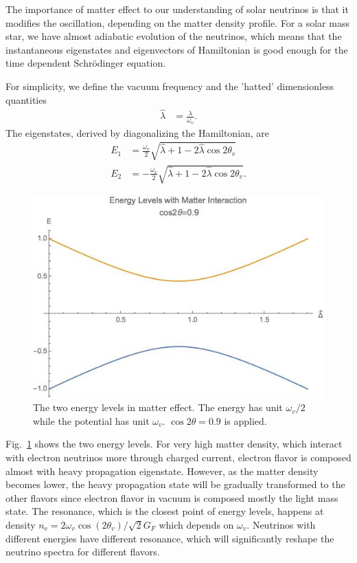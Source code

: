 The importance of matter effect to our understanding of solar neutrinos is that it modifies the oscillation, depending on the matter density profile. For a solar mass star, we have almost adiabatic evolution of the neutrinos, which means that the instantaneous eigenstates and eigenvectors of Hamiltonian is good enough for the time dependent Schr\"{o}dinger equation. 


For simplicity, we define the vacuum frequency and the 'hatted' dimensionless quantities
\begin{align}
\hat\lambda & = \frac{\lambda}{\omega_v}.
\end{align}
The eigenstates, derived by diagonalizing the Hamiltonian, are
\begin{align}
E_1 &= \frac{\omega_v}{2}\sqrt{ \hat\lambda +1 -  2\hat\lambda \cos 2\theta_v }\\
E_2 &= -\frac{\omega_v}{2}\sqrt{ \hat\lambda +1 -  2\hat\lambda \cos 2\theta_v }.
\end{align}


\begin{figure}
\centering
\includegraphics[width=0.7\columnwidth]{chapters/assets/solar/mswEnergyLevels.jpg}
\caption{The two energy levels in matter effect. The energy has unit $\omega_v/2$ while the potential has unit $\omega_v$. $\cos2\theta=0.9$ is applied.}
\label{fig:mswEnergyLevels}
\end{figure}

Fig.~\ref{fig:mswEnergyLevels} shows the two energy levels. For very high matter density, which interact with electron neutrinos more through charged current, electron flavor is composed almost with heavy propagation eigenstate. However, as the matter density becomes lower, the heavy propagation state will be gradually transformed to the other flavors since electron flavor in vacuum is composed mostly the light mass state. The resonance, which is the closest point of energy levels, happens at density $n_{\mathrm e} = 2\omega_v \cos(2\theta_v)/\sqrt{2}G_F$ which depends on $\omega_v$. Neutrinos with different energies have different resonance, which will significantly reshape the neutrino spectra for different flavors. 

